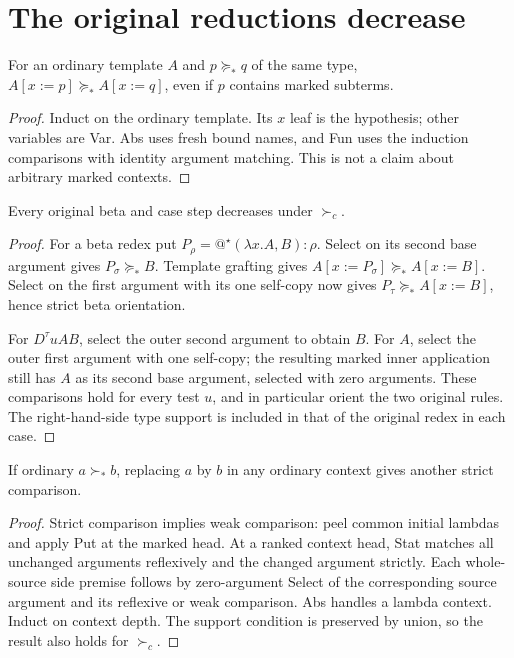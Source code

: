 \documentclass[11pt,a4paper]{article}
\begin{document}
\section{The original reductions decrease}
\begin{lemma}\label{lem:graft}
For an ordinary template $A$ and $p\succeq_*q$ of the same type,
$A[x:=p]\succeq_*A[x:=q]$, even if $p$ contains marked subterms.
\end{lemma}
\begin{proof}
Induct on the ordinary template.  Its $x$ leaf is the hypothesis; other
variables are Var.  Abs uses fresh bound names, and Fun uses the induction
comparisons with identity argument matching.  This is not a claim about
arbitrary marked contexts.
\end{proof}
\begin{lemma}\label{lem:betacases}
Every original beta and case step decreases under $\succ_c$.
\end{lemma}
\begin{proof}
For a beta redex put $P_\rho=@^\star(\lambda x.A,B):\rho$.
Select on its second base argument gives $P_\sigma\succeq_*B$.
Template grafting gives $A[x:=P_\sigma]\succeq_*A[x:=B]$.
Select on the first argument with its one self-copy now gives
$P_\tau\succeq_*A[x:=B]$, hence strict beta orientation.

For $D^\tau uAB$, select the outer second argument to obtain $B$.
For $A$, select the outer first argument with one self-copy; the resulting
marked inner application still has $A$ as its second base argument, selected
with zero arguments.  These comparisons hold for every test $u$, and in
particular orient the two original rules.  The right-hand-side type support
is included in that of the original redex in each case.
\end{proof}

\begin{lemma}\label{lem:context}
If ordinary $a\succ_*b$, replacing $a$ by $b$ in any ordinary context gives
another strict comparison.
\end{lemma}
\begin{proof}
Strict comparison implies weak comparison: peel common initial lambdas and
apply Put at the marked head.  At a ranked context head, Stat matches all
unchanged arguments reflexively and the changed argument strictly.  Each
whole-source side premise follows by zero-argument Select of the corresponding
source argument and its reflexive or weak comparison.  Abs handles a lambda
context.  Induct on context depth.  The support condition is preserved by
union, so the result also holds for $\succ_c$.
\end{proof}
\end{document}
